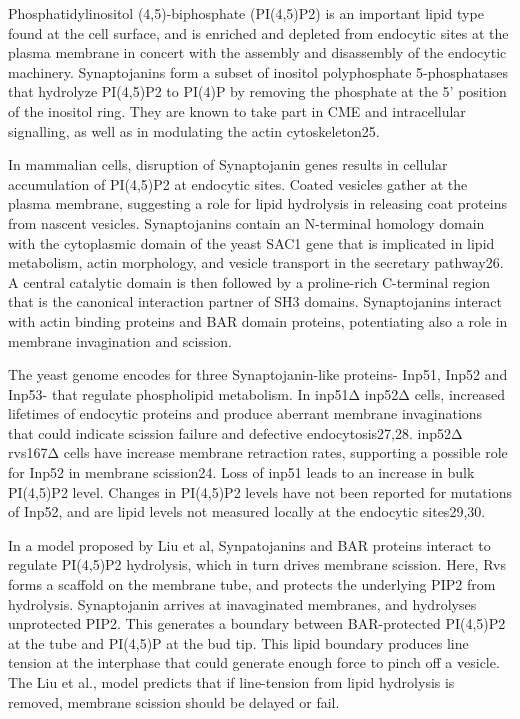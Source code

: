 \vspace{5mm}
Phosphatidylinositol (4,5)-biphosphate (PI(4,5)P2) is an important lipid type found at the cell surface, and is enriched and depleted from endocytic sites at the plasma membrane in concert with the assembly and disassembly of the endocytic machinery. Synaptojanins form a subset of inositol polyphosphate 5-phosphatases that hydrolyze PI(4,5)P2 to PI(4)P by removing the phosphate at the 5’ position of the inositol ring. They are known to take part in CME and intracellular signalling, as well as in modulating the actin cytoskeleton25. 

\vspace{5mm}
In mammalian cells, disruption of Synaptojanin genes results in cellular accumulation of PI(4,5)P2 at endocytic sites. Coated vesicles gather at the plasma membrane, suggesting a role for lipid hydrolysis in releasing coat proteins from nascent vesicles. Synaptojanins contain an N-terminal homology domain with the cytoplasmic domain of the yeast SAC1 gene that is implicated in lipid metabolism, actin morphology, and vesicle transport in the secretary pathway26. A central catalytic domain is then followed by a proline-rich C-terminal region that is the canonical interaction partner of SH3 domains. Synaptojanins interact with actin binding proteins and BAR domain proteins, potentiating also a role in membrane invagination and scission. 

\vspace{5mm}
The yeast genome encodes for three Synaptojanin-like proteins- Inp51, Inp52 and Inp53- that regulate phospholipid metabolism. In inp51Δ inp52Δ cells, increased lifetimes of endocytic proteins and produce aberrant membrane invaginations that could indicate scission failure and defective endocytosis27,28. inp52Δ rvs167Δ cells have increase membrane retraction rates, supporting a possible role for Inp52 in membrane scission24. Loss of inp51 leads to an increase in bulk PI(4,5)P2 level. Changes in PI(4,5)P2 levels have not been reported for mutations of Inp52, and are lipid levels not measured locally at the endocytic sites29,30.

\vspace{5mm}
In a model proposed by Liu et al, Synpatojanins and BAR proteins interact to regulate PI(4,5)P2 hydrolysis, which in turn drives membrane scission. Here, Rvs forms a scaffold on the membrane tube, and protects the underlying PIP2 from hydrolysis. Synaptojanin arrives at inavaginated membranes, and hydrolyses unprotected PIP2. This generates a boundary between BAR-protected PI(4,5)P2 at the tube and PI(4,5)P at the bud tip. This lipid boundary produces line tension at the interphase that could generate enough force to pinch off a vesicle. The Liu et al., model predicts that if line-tension from lipid hydrolysis is removed, membrane scission should be delayed or fail.



